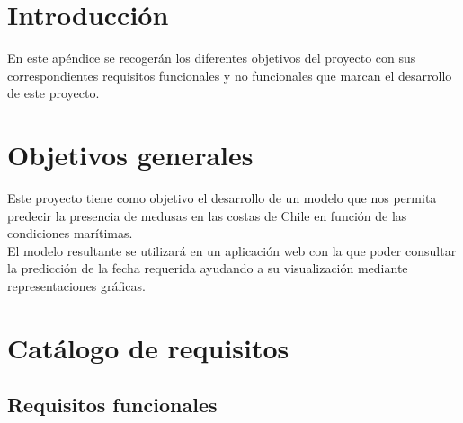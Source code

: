 
\section{Introducción}
En este apéndice se recogerán los diferentes objetivos del proyecto con sus correspondientes requisitos funcionales y no funcionales que marcan el desarrollo de este proyecto.

\section{Objetivos generales}

Este proyecto tiene como objetivo el desarrollo de un modelo que nos permita predecir la presencia de medusas en las costas de Chile en función de las condiciones marítimas.\\
El modelo resultante se utilizará en un aplicación web con la que poder consultar la predicción de la fecha requerida ayudando a su visualización mediante representaciones gráficas.

\section{Catálogo de requisitos}

	\subsection{Requisitos funcionales}


